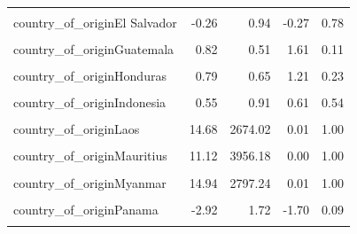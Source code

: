 \documentclass[
  letterpaper,
  DIV=11,
  numbers=noendperiod]{scrartcl}
\begin{document}
\begin{table}[!h]
\begin{threeparttable}
\begin{tabular}{lrrrr}
\cellcolor{gray!10}{country\_of\_originEcuador} & \cellcolor{gray!10}{1.20} & \cellcolor{gray!10}{1.48} & \cellcolor{gray!10}{0.81} & \cellcolor{gray!10}{0.42}\\
country\_of\_originEl Salvador & -0.26 & 0.94 & -0.27 & 0.78\\
\cellcolor{gray!10}{country\_of\_originEthiopia} & \cellcolor{gray!10}{-10.89} & \cellcolor{gray!10}{646.51} & \cellcolor{gray!10}{-0.02} & \cellcolor{gray!10}{0.99}\\
country\_of\_originGuatemala & 0.82 & 0.51 & 1.61 & 0.11\\
\addlinespace
\cellcolor{gray!10}{country\_of\_originHaiti} & \cellcolor{gray!10}{-2.10} & \cellcolor{gray!10}{1.87} & \cellcolor{gray!10}{-1.12} & \cellcolor{gray!10}{0.26}\\
country\_of\_originHonduras & 0.79 & 0.65 & 1.21 & 0.23\\
\cellcolor{gray!10}{country\_of\_originIndia} & \cellcolor{gray!10}{3.82} & \cellcolor{gray!10}{1.22} & \cellcolor{gray!10}{3.14} & \cellcolor{gray!10}{0.00}\\
country\_of\_originIndonesia & 0.55 & 0.91 & 0.61 & 0.54\\
\cellcolor{gray!10}{country\_of\_originKenya} & \cellcolor{gray!10}{-0.61} & \cellcolor{gray!10}{1.45} & \cellcolor{gray!10}{-0.42} & \cellcolor{gray!10}{0.67}\\
\addlinespace
country\_of\_originLaos & 14.68 & 2674.02 & 0.01 & 1.00\\
\cellcolor{gray!10}{country\_of\_originMalawi} & \cellcolor{gray!10}{1.35} & \cellcolor{gray!10}{1.23} & \cellcolor{gray!10}{1.09} & \cellcolor{gray!10}{0.27}\\
country\_of\_originMauritius & 11.12 & 3956.18 & 0.00 & 1.00\\
\cellcolor{gray!10}{country\_of\_originMexico} & \cellcolor{gray!10}{0.87} & \cellcolor{gray!10}{0.48} & \cellcolor{gray!10}{1.83} & \cellcolor{gray!10}{0.07}\\
country\_of\_originMyanmar & 14.94 & 2797.24 & 0.01 & 1.00\\
\addlinespace
\cellcolor{gray!10}{country\_of\_originNicaragua} & \cellcolor{gray!10}{-0.13} & \cellcolor{gray!10}{1.82} & \cellcolor{gray!10}{-0.07} & \cellcolor{gray!10}{0.94}\\
country\_of\_originPanama & -2.92 & 1.72 & -1.70 & 0.09\\
\cellcolor{gray!10}{country\_of\_originPeru} & \cellcolor{gray!10}{13.57} & \cellcolor{gray!10}{3956.18} & \cellcolor{gray!10}{0.00} & \cellcolor{gray!10}{1.00}\\

\end{tabular}
\end{threeparttable}
\end{table}
\end{document}
